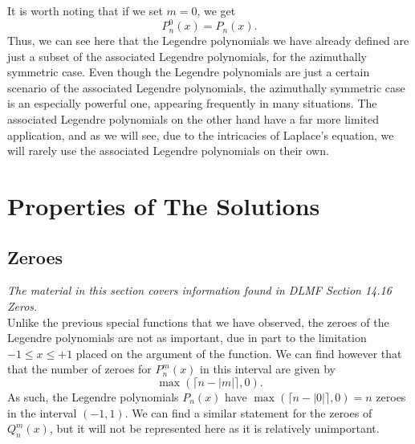\documentclass[11pt]{report}
\newcommand{\fabs}[1]{\left|{#1}\right|}
\begin{document}
It is worth noting that if we set $m=0$, we get
    \begin{equation}
        P_n^0(x) = P_n(x).
    \end{equation}
Thus, we can see here that the Legendre polynomials we have already defined are just a subset of the associated Legendre polynomials, for the azimuthally symmetric case. Even though the Legendre polynomials are just a certain scenario of the associated Legendre polynomials, the azimuthally symmetric case is an especially powerful one, appearing frequently in many situations. The associated Legendre polynomials on the other hand have a far more limited application, and as we will see, due to the intricacies of Laplace's equation, we will rarely use the associated Legendre polynomials on their own.\\

\section{Properties of The Solutions}
\subsection{Zeroes}

\emph{The material in this section covers information found in DLMF Section 14.16 Zeros.}\\


Unlike the previous special functions that we have observed, the zeroes of the Legendre polynomials are not as important, due in part to the limitation $-1\leq x\leq+1$ placed on the argument of the function. We can find however that that the number of zeroes for $P_n^m(x)$ in this interval are given by
    \begin{equation*}
        \max(\lceil n-\fabs{m}\rceil,0).
    \end{equation*}
As such, the Legendre polynomials $P_n(x)$ have $\max(\lceil n-\fabs{0}\rceil,0)=n$ zeroes in the interval $(-1,1)$. We can find a similar statement for the zeroes of $Q_n^m(x)$, but it will not be represented here as it is relatively unimportant.

\end{document}
